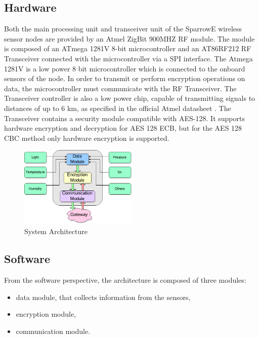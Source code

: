 \label{chap:arch}
\subsection{Hardware}

Both the main processing unit and transceiver unit of the SparrowE wireless sensor nodes are provided by an Atmel
ZigBit 900MHZ RF module. The module is composed of an ATmega 1281V 8-bit microcontroller and an
AT86RF212 RF Transceiver connected with the microcontroller via a SPI interface. The Atmega 1281V is a low power 8 bit microcontroller
which is connected to the onboard sensors of the node. In order to transmit or perform encryption operations on 
data, the microcontroller must communicate with the RF Transceiver. The Transceiver controller is also a low power chip,
capable of transmitting signals to distances of up to 6 km, as specified in the official Atmel datasheet \cite{datasheetatmel}. The Transceiver contains a security module compatible
with AES-128. It supports hardware encryption and decryption for AES 128 ECB, but for the AES
128 CBC method only hardware encryption is supported.


\begin{figure}[ht] \centering
  \includegraphics[width=0.5\textwidth]{img/wsn-soa-system-arch.png}
  \caption{System Architecture}
\end{figure}

\subsection{Software}

From the software perspective, the architecture is composed of three modules:
\begin{itemize}
\item data module, that
collects information from the sensors,
\item encryption module,
\item communication module.
\end{itemize}

